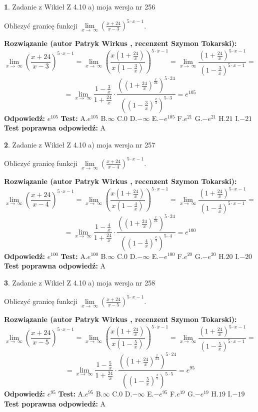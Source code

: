 \documentclass[12pt, a4paper]{article}
\theoremstyle{definition} %
\newtheorem{zad}{}
\newcommand{\zadStart}[1]{\begin{zad}#1\newline}
\newcommand{\zadStop}{\end{zad}}
\newcommand{\rozwStart}[2]{\noindent \textbf{Rozwiązanie (autor #1 , recenzent #2): }\newline}
\newcommand{\rozwStop}{\newline}
\newcommand{\odpStart}{\noindent \textbf{Odpowiedź:}\newline}
\newcommand{\odpStop}{\newline}
\newcommand{\testStart}{\noindent \textbf{Test:}\newline}
\newcommand{\testStop}{\newline}
\newcommand{\kluczStart}{\noindent \textbf{Test poprawna odpowiedź:}\newline}
\newcommand{\kluczStop}{\newline}
\begin{document}
\zadStart{Zadanie z Wikieł Z 4.10 a) moja wersja nr 256}

Obliczyć granicę funkcji  $\lim\limits_{x\to\ \infty}(\frac{x+24}{x-3})^{5\cdot x-1}$.
\zadStop
\rozwStart{Patryk Wirkus}{Szymon Tokarski}
$$\lim\limits_{x\to\ \infty}(\frac{x+24}{x-3})^{5\cdot x-1} = \lim\limits_{x\to\ \infty}(\frac{x(1+\frac{24}{x})}{x(1-\frac{3}{x})})^{5\cdot x-1}=\lim\limits_{x\to\ \infty}\frac{(1+\frac{24}{x})^{5\cdot x-1}}{(1-\frac{3}{x})^{5\cdot x-1}}=$$
$$=\lim\limits_{x\to\ \infty}\frac{1-\frac{3}{x}}{1+\frac{24}{x}}\cdot\frac{((1+\frac{24}{x})^{\frac{x}{24}})^{5\cdot24}}{((1-\frac{3}{x})^{\frac{x}{3}})^{5\cdot3}}=e^{105}$$
\rozwStop
\odpStart
$e^{105}$
\odpStop
\testStart
A.$e^{105}$ B.$\infty$ C.$0$ D.$-\infty$ E.$-e^{105}$
F.$e^{21}$ G.$-e^{21}$
H.$21$
I.$-21$
\testStop
\kluczStart
A
\kluczStop



\zadStart{Zadanie z Wikieł Z 4.10 a) moja wersja nr 257}

Obliczyć granicę funkcji  $\lim\limits_{x\to\ \infty}(\frac{x+24}{x-4})^{5\cdot x-1}$.
\zadStop
\rozwStart{Patryk Wirkus}{Szymon Tokarski}
$$\lim\limits_{x\to\ \infty}(\frac{x+24}{x-4})^{5\cdot x-1} = \lim\limits_{x\to\ \infty}(\frac{x(1+\frac{24}{x})}{x(1-\frac{4}{x})})^{5\cdot x-1}=\lim\limits_{x\to\ \infty}\frac{(1+\frac{24}{x})^{5\cdot x-1}}{(1-\frac{4}{x})^{5\cdot x-1}}=$$
$$=\lim\limits_{x\to\ \infty}\frac{1-\frac{4}{x}}{1+\frac{24}{x}}\cdot\frac{((1+\frac{24}{x})^{\frac{x}{24}})^{5\cdot24}}{((1-\frac{4}{x})^{\frac{x}{4}})^{5\cdot4}}=e^{100}$$
\rozwStop
\odpStart
$e^{100}$
\odpStop
\testStart
A.$e^{100}$ B.$\infty$ C.$0$ D.$-\infty$ E.$-e^{100}$
F.$e^{20}$ G.$-e^{20}$
H.$20$
I.$-20$
\testStop
\kluczStart
A
\kluczStop



\zadStart{Zadanie z Wikieł Z 4.10 a) moja wersja nr 258}

Obliczyć granicę funkcji  $\lim\limits_{x\to\ \infty}(\frac{x+24}{x-5})^{5\cdot x-1}$.
\zadStop
\rozwStart{Patryk Wirkus}{Szymon Tokarski}
$$\lim\limits_{x\to\ \infty}(\frac{x+24}{x-5})^{5\cdot x-1} = \lim\limits_{x\to\ \infty}(\frac{x(1+\frac{24}{x})}{x(1-\frac{5}{x})})^{5\cdot x-1}=\lim\limits_{x\to\ \infty}\frac{(1+\frac{24}{x})^{5\cdot x-1}}{(1-\frac{5}{x})^{5\cdot x-1}}=$$
$$=\lim\limits_{x\to\ \infty}\frac{1-\frac{5}{x}}{1+\frac{24}{x}}\cdot\frac{((1+\frac{24}{x})^{\frac{x}{24}})^{5\cdot24}}{((1-\frac{5}{x})^{\frac{x}{5}})^{5\cdot5}}=e^{95}$$
\rozwStop
\odpStart
$e^{95}$
\odpStop
\testStart
A.$e^{95}$ B.$\infty$ C.$0$ D.$-\infty$ E.$-e^{95}$
F.$e^{19}$ G.$-e^{19}$
H.$19$
I.$-19$
\testStop
\kluczStart
A
\kluczStop
\end{document}
